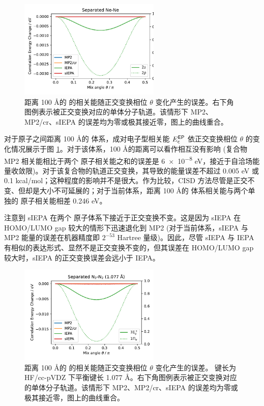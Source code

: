 \begin{figure}[!ht]
  \centering
  \includegraphics[width=0.6\textwidth]{assets/invar-sep-Ne.pdf}
  \caption[ 对称性简并轨道正交变换误差]{距离 100 \AA 的  的相关能随正交变换相位 $\theta$ 变化产生的误差。右下角图例表示被正交变换对应的单体分子轨道。该情形下 MP2、MP2/cr、sIEPA 的误差均为零或极其接近零，图上的曲线重合。}
  \label{fig.2.invar-sep-Ne}
\end{figure}

对于原子之间距离 100 \AA 的  体系，成对电子型相关能 $E_{\textsf{c}}^{\textsf{EP}}$ 依正交变换相位 $\theta$ 的变化情况展示于图 \ref{fig.2.invar-sep-Ne}。对于该体系，100 \AA 的距离可以看作相互没有影响 (复合物 MP2 相关能相比于两个  原子相关能之和的误差是 \num{6e-8} eV，接近于自洽场能量收敛限)。对于该复合物的轨道正交变换，其导致的能量误差不超过 0.005 eV 或 0.1 kcal/mol；这种程度的影响并不是很大。作为比较，CISD 方法尽管是正交不变、但却是大小不可延展的；对于当前体系，距离 100 \AA 的  体系相关能与两个单独的  原子相关能相差 0.246 eV。

注意到 sIEPA 在两个  原子体系下接近于正交变换不变。这是因为 sIEPA 在 HOMO/LUMO gap 较大的情形下迅速退化到 MP2 (对于当前体系，sIEPA 与 MP2 能量的误差在机器精度即 $2^{-53}$ Hartree 量级)。因此，尽管 sIEPA 与 IEPA 有相似的表达形式、显然不是正交变换不变的，但其误差在 HOMO/LUMO gap 较大时，sIEPA 的正交变换误差会远小于 IEPA。

\begin{figure}[!ht]
  \centering
  \includegraphics[width=0.6\textwidth]{assets/invar-sep-N2-1.pdf}
  \caption[ 对称性简并轨道正交变换误差 (键长 1.077 \AA)]{距离 100 \AA 的  的相关能随正交变换相位 $\theta$ 变化产生的误差。 键长为 HF/cc-pVDZ 下平衡键长 1.077 \AA。右下角图例表示被正交变换对应的单体分子轨道。该情形下 MP2、MP2/cr、sIEPA 的误差均为零或极其接近零，图上的曲线重合。}
  \label{fig.2.invar-sep-N2-1}
\end{figure}

